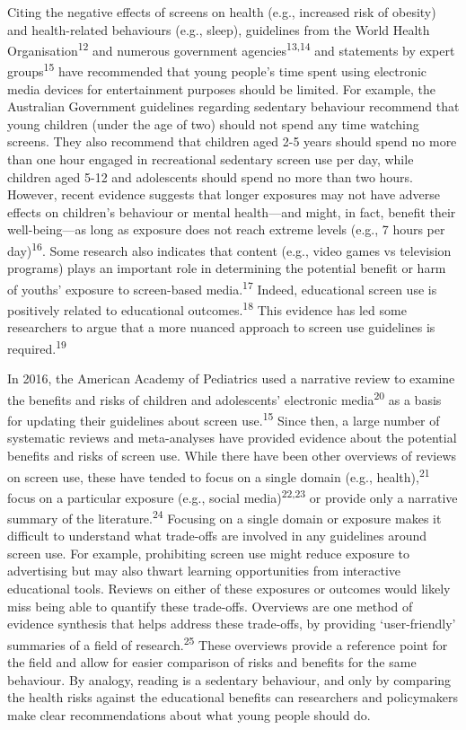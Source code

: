 \documentclass[
  english,
  man]{apa6}
\begin{document}
Citing the negative effects of screens on health (e.g., increased risk of obesity) and health-related behaviours (e.g., sleep), guidelines from the World Health Organisation\textsuperscript{12} and numerous government agencies\textsuperscript{13,14} and statements by expert groups\textsuperscript{15} have recommended that young people's time spent using electronic media devices for entertainment purposes should be limited.
For example, the Australian Government guidelines regarding sedentary behaviour recommend that young children (under the age of two) should not spend any time watching screens.
They also recommend that children aged 2-5 years should spend no more than one hour engaged in recreational sedentary screen use per day, while children aged 5-12 and adolescents should spend no more than two hours.
However, recent evidence suggests that longer exposures may not have adverse effects on children's behaviour or mental health---and might, in fact, benefit their well-being---as long as exposure does not reach extreme levels (e.g., 7 hours per day)\textsuperscript{16}.
Some research also indicates that content (e.g., video games vs television programs) plays an important role in determining the potential benefit or harm of youths' exposure to screen-based media.\textsuperscript{17}
Indeed, educational screen use is positively related to educational outcomes.\textsuperscript{18}
This evidence has led some researchers to argue that a more nuanced approach to screen use guidelines is required.\textsuperscript{19}

In 2016, the American Academy of Pediatrics used a narrative review to examine the benefits and risks of children and adolescents' electronic media\textsuperscript{20} as a basis for updating their guidelines about screen use.\textsuperscript{15}
Since then, a large number of systematic reviews and meta-analyses have provided evidence about the potential benefits and risks of screen use.
While there have been other overviews of reviews on screen use, these have tended to focus on a single domain (e.g., health),\textsuperscript{21} focus on a particular exposure (e.g., social media)\textsuperscript{22,23} or provide only a narrative summary of the literature.\textsuperscript{24}
Focusing on a single domain or exposure makes it difficult to understand what trade-offs are involved in any guidelines around screen use.
For example, prohibiting screen use might reduce exposure to advertising but may also thwart learning opportunities from interactive educational tools.
Reviews on either of these exposures or outcomes would likely miss being able to quantify these trade-offs.
Overviews are one method of evidence synthesis that helps address these trade-offs, by providing `user-friendly' summaries of a field of research.\textsuperscript{25}
These overviews provide a reference point for the field and allow for easier comparison of risks and benefits for the same behaviour.
By analogy, reading is a sedentary behaviour, and only by comparing the health risks against the educational benefits can researchers and policymakers make clear recommendations about what young people should do.
\end{document}
